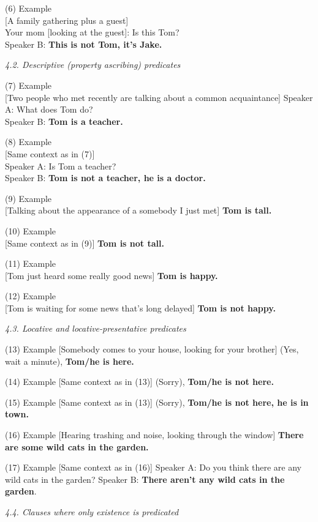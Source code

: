 ﻿\documentclass[output=paper]{langsci/langscibook}
\begin{document}
\begin{unindented}
(6) Example\\
{}[A family gathering plus a guest]\\
Your mom [looking at the guest]: Is this Tom?\\
Speaker B: \textbf{This is not Tom, it's Jake.}

\textit{4.2. Descriptive (property ascribing) predicates}

(7) Example\\
{}[Two people who met recently are talking about a common acquaintance]
Speaker A: What does Tom do?\\
Speaker B: \textbf{Tom is a teacher.}

(8) Example\\
{}[Same context as in (7)]\\
Speaker A: Is Tom a teacher?\\
Speaker B: \textbf{Tom is not a teacher, he is a doctor.}

(9) Example\\
{}[Talking about the appearance of a somebody I just met] \textbf{Tom is
tall.}

(10) Example\\
{}[Same context as in (9)] \textbf{Tom is not tall.}

(11) Example\\
{}[Tom just heard some really good news] \textbf{Tom is happy.}

(12) Example\\
{}[Tom is waiting for some news that's long delayed] \textbf{Tom is not
happy.}

\textit{4.3. Locative and locative-presentative predicates} 

(13) Example
{}[Somebody comes to your house, looking for your brother] (Yes, wait a
minute), \textbf{Tom/he is here.} 

(14) Example
{}[Same context as in (13)] (Sorry), \textbf{Tom/he is not
here.} 

(15) Example
{}[Same context as in (13)] (Sorry), \textbf{Tom/he is not
here, he is in town.} 

(16) Example
{}[Hearing trashing and noise, looking through the window] \textbf{There
are some wild cats in the garden.} 

(17) Example
{}[Same context as in (16)] Speaker A: Do you think there are
any wild cats in the garden? Speaker B: \textbf{There aren’t any wild cats
in the garden}. 

\textit{4.4. Clauses where only existence is predicated} 


\end{unindented}
\end{document}
